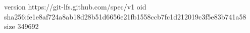version https://git-lfs.github.com/spec/v1
oid sha256:fe1e8af724a8ab18d28b51d6656e21fb1558ccb7fc1d212019c3f5e83b741a58
size 349692
